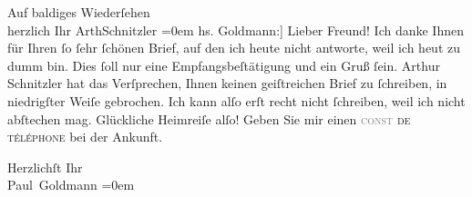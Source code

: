 \pstart
           Auf baldiges Wiederſehen{\\[\baselineskip]}herzlich Ihr \spacefill\mbox{ArthSchnitzler}\pend
           \leftskip=0em{}\vspace{1em}
\pstart{}{\pb}{[}hs. Goldmann:{]} Lieber
                  Freund!\pend\vspace{0.5em}
\pstart
           Ich danke Ihnen für Ihren ſo ſehr ſchönen Brief, auf den ich heute nicht antworte,
               weil ich heut zu dumm bin. Dies ſoll nur eine Empfangsbeſtätigung und ein Gruß ſein.
               Arthur Schnitzler hat das Verſprechen, Ihnen keinen geiſtreichen Brief zu ſchreiben,
               in niedrigſter Weiſe gebrochen. Ich kann alſo erſt recht nicht ſchreiben, weil ich
               nicht abſtechen mag. Glückliche Heimreiſe alſo! Geben Sie mir einen \textsc{\textcolor{gray}{conſt} de}{ }\textsc{téléphone} bei der Ankunft.\pend
           
\pstart
           Herzlichſt Ihr{\\[\baselineskip]}\spacefill\mbox{Paul Goldmann}\pend
           \leftskip=0em{}\endnumbering{}  \newcommand{\dateiname}{L03905}\newcommand{\titel}{Arthur Schnitzler an Theodor Herzl, 19. 9. 1893}\newcommand{\editorInnen}{Herausgegeben von Jahnke, SelmaMüller, Martin Anton}
